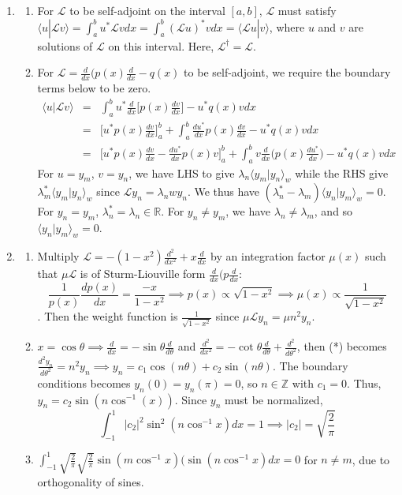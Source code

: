 \documentclass[a4paper]{article}
\begin{document}
\begin{ans}\leavevmode
\begin{enumerate}[label=(\alph*)]
\item
\begin{enumerate}[label=(\roman*)]
\item
For $\mathcal{L}$ to be self-adjoint on the interval $[a,b]$, $\mathcal{L}$ must satisfy $\langle u|\mathcal{L}v\rangle=\int_a^bu^*\mathcal{L}vdx=\int_a^b(\mathcal{L}u)^*vdx=\langle\mathcal{L}u|v\rangle$, where $u$ and $v$ are solutions of $\mathcal{L}$ on this interval. Here, $\mathcal{L}^\dag=\mathcal{L}$.
\item
For $\mathcal{L}=\frac{d}{dx}(p(x)\frac{d}{dx}-q(x)$ to be self-adjoint, we require the boundary terms below to be zero.
\begin{eqnarray}
\langle u|\mathcal{L}v\rangle&=&\int_a^bu^*\frac{d}{dx}\bigg[p(x)\frac{dv}{dx}\bigg]-u^*q(x)vdx\nonumber\\&=&\bigg[u^*p(x)\frac{dv}{dx}\bigg]_a^b+\int_a^b\frac{du^*}{dx}p(x)\frac{dv}{dx}-u^*q(x)vdx\nonumber\\&=&\bigg[u^*p(x)\frac{dv}{dx}-\frac{du^*}{dx}p(x)v\bigg]^b_a+\int_a^bv\frac{d}{dx}\bigg(p(x)\frac{du^*}{dx}\bigg)-u^*q(x)vdx\nonumber
\end{eqnarray}
For $u=y_m$, $v=y_n$, we have LHS to give $\lambda_n\langle y_m|y_n\rangle_w$ while the RHS give $\lambda_m^*\langle y_m|y_n\rangle_w$ since $\mathcal{L}y_n=\lambda_nwy_n$. We thus have $(\lambda_n^*-\lambda_m)\langle y_n|y_m\rangle_w=0$. For $y_n=y_m$, $\lambda_n^*=\lambda_n\in\mathbb{R}$. For $y_n\neq y_m$, we have $\lambda_n\neq\lambda_m$, and so $\langle y_n|y_m\rangle_w=0$.
\end{enumerate}
\item
\begin{enumerate}[label=(\roman*)]
\item Multiply $\mathcal{L}=-(1-x^2)\frac{d^2}{dx^2}+x\frac{d}{dx}$ by an integration factor $\mu(x)$ such that $\mu\mathcal{L}$ is of Sturm-Liouville form $\frac{d}{dx}(p\frac{d}{dx}$:
$$\frac{1}{p(x)}\frac{dp(x)}{dx}=\frac{-x}{1-x^2}\implies p(x)\propto\sqrt{1-x^2}\implies\mu(x)\propto\frac{1}{\sqrt{1-x^2}}$$. 
Then the weight function is $\frac{1}{\sqrt{1-x^2}}$ since $\mu\mathcal{L}y_n=\mu n^2y_n$.
\item $x=\cos\theta\implies\frac{d}{dx}=-\sin\theta\frac{d}{d\theta}$ and $\frac{d^2}{dx^2}=-\cot\theta\frac{d}{d\theta}+\frac{d^2}{d\theta^2}$, then (*) becomes $\frac{d^2y_n}{d\theta^2}=n^2y_n\implies y_n=c_1\cos(n\theta)+c_2\sin(n\theta)$. The boundary conditions becomes $y_n(0)=y_n(\pi)=0$, so $n\in\mathbb{Z}$ with $c_1=0$. Thus, $y_n=c_2\sin(n\cos^{-1}(x))$. Since $y_n$ must be normalized,
$$\int_{-1}^1|c_2|^2\sin^2(n\cos^{-1}x)dx=1\implies|c_2|=\sqrt{\frac{2}{\pi}}$$
\item $\int_{-1}^1\sqrt{\frac{2}{\pi}}\sqrt{\frac{2}{\pi}}\sin(m\cos^{-1}x)(\sin(n\cos^{-1}x)dx=0$ for $n\neq m$, due to orthogonality of sines.
\end{enumerate}
\end{enumerate}
\end{ans}
\end{document}
